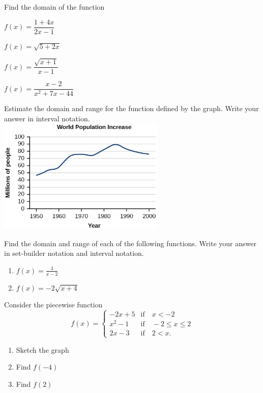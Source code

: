 \begin{exercise}
  Find the domain of the function\\
  \begin{enumerate*}
    \item  $f(x)=\dfrac{1+4x}{2x-1}$ 
    \item  $f(x)=\sqrt{5+2x}$
    \item  $f(x)=\dfrac{\sqrt{x+1}}{x-1}$
    \item $f(x)=\dfrac{x-2}{x^2+7x-44}$
  \end{enumerate*}
\end{exercise}

\begin{exercise}
  Estimate the domain and range for the function defined by the graph. Write your answer in interval notation.\\
  \includegraphics[width=0.6\textwidth]{figs/CNX_Precalc_Figure_01_02_010.jpg}
\end{exercise}
\vspace*{-5\baselineskip}

\newpage

\begin{exercise}
  Find the domain and range of each of the following functions. Write your answer in set-builder notation and interval notation.
  \begin{enumerate}[twocol]
    \item $f(x)=\frac{3}{x-2}$
    \item $f(x)=-2\sqrt{x+4}$
  \end{enumerate}
\end{exercise}

\begin{exercise}
  Consider the piecewise function
  $$f(x)=\begin{cases}
    -2x+5 & \text{if}\quad x< -2\\
    x^2-1 & \text{if}\quad -2\le x\le 2\\
    2x-3 & \text{if}\quad 2< x.
  \end{cases}$$
  \begin{enumerate}[threecol]
    \item Sketch the graph
    \item Find $f(-4)$
    \item Find $f(2)$
  \end{enumerate}
\end{exercise}

